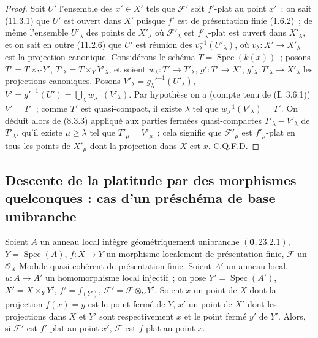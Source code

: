 \begin{proof}
Soit $U'$ l'ensemble des $x'\in X'$ tels que $\mathcal F'$ soit $f'$-plat au
point $x'$~; on sait (11.3.1) que $U'$ est ouvert dans $X'$ puisque $f'$ est de
présentation finie (1.6.2)~; de même l'ensemble $U'_{\lambda}$ des points de
$X'_{\lambda}$ où $\mathcal F'_{\lambda}$ est $f'_{\lambda}$-plat est ouvert
dans $X'_{\lambda}$, et on sait en outre (11.2.6) que $U'$ est réunion des
$v_{\lambda}^{-1}(U'_{\lambda})$, où
$v_{\lambda}:X'\to X'_{\lambda}$ est la projection canonique. Considérons le
schéma $T=\operatorname{Spec}(k(x))$~; posons $T'=T\times_Y Y'$,
$T'_{\lambda}=T\times_Y Y'_{\lambda}$, et soient
$w_{\lambda}:T'\to T'_{\lambda}$, $g':T'\to X'$,
$g'_{\lambda}:T'_{\lambda}\to X'_{\lambda}$ les projections canoniques. Posons
$V'_{\lambda}=g_{\lambda}'^{-1}(U'_{\lambda})$,
$V'=g'^{-1}(U')=\bigcup_{\lambda}w_{\lambda}^{-1}(V'_{\lambda})$. Par
hypothèse on a (compte tenu de (\textbf I, 3.6.1)) $V'=T'$~; comme $T'$ est
quasi-compact, il existe $\lambda$ tel que
$w_{\lambda}^{-1}(V'_{\lambda})=T'$. On déduit alors de (8.3.3) appliqué aux
parties fermées quasi-compactes $T'_{\lambda}-V'_{\lambda}$ de
$T'_{\lambda}$, qu'il existe $\mu\geq\lambda$ tel que
$T'_{\mu}=V'_{\mu}$~; cela signifie que $\mathcal F'_{\mu}$ est
$f'_{\mu}$-plat en tous les points de $X'_{\mu}$ dont la projection dans $X$
est $x$. C.Q.F.D.
\end{proof}

\subsection{Descente de la platitude par des morphismes quelconques : cas d'un
préschéma de base unibranche}
\label{subsection:IV.11.6-fr}

\begin{theorem}[11.6.1]
\label{IV.11.6.1-fr}
Soient $A$ un anneau local intègre géométriquement unibranche
$(\mathbf 0,23.2.1)$, $Y=\operatorname{Spec}(A)$, $f:X\to Y$ un morphisme
localement de présentation finie, $\mathcal F$ un $\mathcal O_X$-Module
quasi-cohérent de présentation finie. Soient $A'$ un anneau local,
$u:A\to A'$ un homomorphisme local injectif~; on pose
$Y'=\operatorname{Spec}(A')$, $X'=X\times_Y Y'$, $f'=f_{(Y')}$,
$\mathcal F'=\mathcal F\otimes_Y Y'$. Soient $x$ un point de $X$ dont la
projection $f(x)=y$ est le point fermé de $Y$, $x'$ un point de $X'$ dont les
projections dans $X$ et $Y'$ sont respectivement $x$ et le point fermé $y'$ de
$Y'$. Alors, si $\mathcal F'$ est $f'$-plat au point $x'$, $\mathcal F$ est
$f$-plat au point $x$.
\end{theorem}

